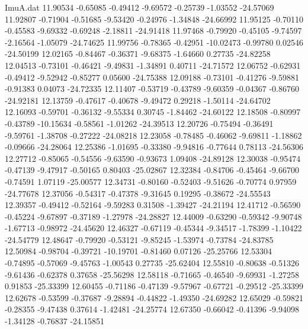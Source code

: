 \begin{filecontents}{ImuA.dat}
  11.90534   -0.65085   -0.49412   -9.69572   -0.25739   -1.03552  -24.57069
  11.92807   -0.71904   -0.51685   -9.53420   -0.24976   -1.34848  -24.66992
  11.95125   -0.70110   -0.45583   -9.69332   -0.69248   -2.18811  -24.91418
  11.97468   -0.79920   -0.45105   -9.74597   -2.16564   -1.05079  -24.74625
  11.99756   -0.78365   -0.42951  -10.02473   -0.99780    0.02546  -24.50199
  12.02165   -0.84467   -0.36371   -9.68375   -1.64660    0.27735  -24.82258
  12.04513   -0.73101   -0.46421   -9.49831   -1.34891    0.40711  -24.71572
  12.06752   -0.62931   -0.49412   -9.52942   -0.85277    0.05600  -24.75388
  12.09188   -0.73101   -0.41276   -9.59881   -0.91383    0.04073  -24.72335
  12.11407   -0.53719   -0.43789   -9.60359   -0.04367   -0.86760  -24.92181
  12.13759   -0.47617   -0.40678   -9.49472    0.29218   -1.50114  -24.64702
  12.16093   -0.59701   -0.36132   -9.55334    0.30745   -1.84462  -24.60122
  12.18508   -0.80997   -0.43789  -10.15634   -0.58561   -1.01262  -24.39513
  12.20726   -0.75494   -0.36491   -9.59761   -1.38708   -0.27222  -24.08218
  12.23058   -0.78485   -0.46062   -9.69811   -1.18862   -0.09666  -24.28064
  12.25386   -1.01695   -0.33380   -9.94816   -0.77644    0.78113  -24.56306
  12.27712   -0.85065   -0.54556   -9.63590   -0.93673    1.09408  -24.89128
  12.30038   -0.95474   -0.47139   -9.47917   -0.50165    0.80403  -25.02867
  12.32384   -0.84706   -0.45464   -9.66700   -0.74591    1.07119  -25.00577
  12.34731   -0.80160   -0.52403   -9.51626   -0.70774    0.97959  -24.77678
  12.37056   -0.54317   -0.47378   -9.31645    0.19295   -0.38672  -24.55543
  12.39357   -0.49412   -0.52164   -9.59283    0.31508   -1.39427  -24.21194
  12.41712   -0.56590   -0.45224   -9.67897   -0.37189   -1.27978  -24.28827
  12.44009   -0.63290   -0.59342   -9.90748   -1.67713   -0.98972  -24.45620
  12.46327   -0.67119   -0.45344   -9.34517   -1.78399   -1.10422  -24.54779
  12.48647   -0.79920   -0.53121   -9.85245   -1.53974   -0.73784  -24.83785
  12.50984   -0.98704   -0.39721  -10.19701   -0.81460    0.07126  -25.25766
  12.53304   -0.74895   -0.57069   -9.45763   -1.00543    0.27735  -25.62404
  12.55810   -0.80638   -0.51326   -9.61436   -0.62378    0.37658  -25.56298
  12.58118   -0.71665   -0.46540   -9.69931   -1.27258    0.91853  -25.33399
  12.60455   -0.71186   -0.47139   -9.57967   -0.67721   -0.29512  -25.33399
  12.62678   -0.53599   -0.37687   -9.28894   -0.44822   -1.49350  -24.69282
  12.65029   -0.59821   -0.28355   -9.47438    0.37614   -1.42481  -24.25774
  12.67350   -0.66042   -0.41396   -9.94098   -1.34128   -0.76837  -24.15851

\end{filecontents}
